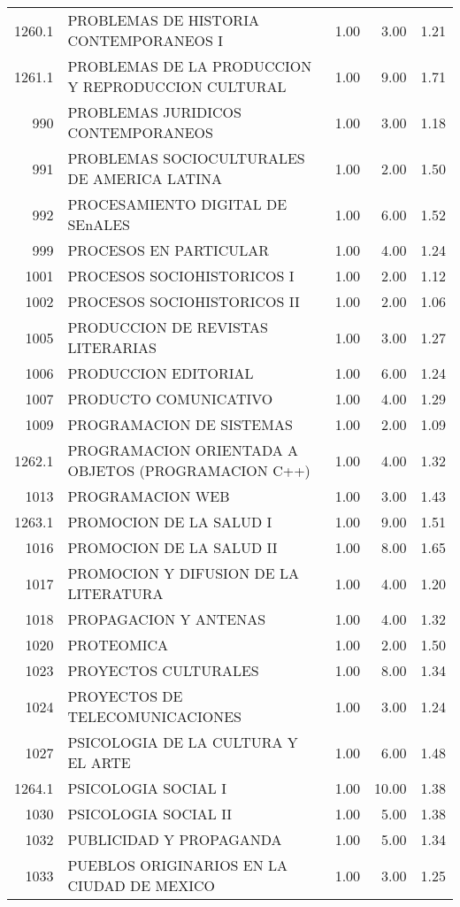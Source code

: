 \begin{table}[ht]
\begin{tabular}{rlrrr}
  1260.1 & PROBLEMAS DE HISTORIA CONTEMPORANEOS I & 1.00 & 3.00 & 1.21 \\ 
  1261.1 & PROBLEMAS DE LA PRODUCCION Y REPRODUCCION CULTURAL & 1.00 & 9.00 & 1.71 \\ 
  990 & PROBLEMAS JURIDICOS CONTEMPORANEOS & 1.00 & 3.00 & 1.18 \\ 
  991 & PROBLEMAS SOCIOCULTURALES DE AMERICA LATINA & 1.00 & 2.00 & 1.50 \\ 
  992 & PROCESAMIENTO DIGITAL DE SEnALES & 1.00 & 6.00 & 1.52 \\ 
  999 & PROCESOS EN PARTICULAR & 1.00 & 4.00 & 1.24 \\ 
  1001 & PROCESOS SOCIOHISTORICOS I & 1.00 & 2.00 & 1.12 \\ 
  1002 & PROCESOS SOCIOHISTORICOS II & 1.00 & 2.00 & 1.06 \\ 
  1005 & PRODUCCION DE REVISTAS LITERARIAS & 1.00 & 3.00 & 1.27 \\ 
  1006 & PRODUCCION EDITORIAL & 1.00 & 6.00 & 1.24 \\ 
  1007 & PRODUCTO COMUNICATIVO & 1.00 & 4.00 & 1.29 \\ 
  1009 & PROGRAMACION DE SISTEMAS & 1.00 & 2.00 & 1.09 \\ 
  1262.1 & PROGRAMACION ORIENTADA A OBJETOS (PROGRAMACION C++) & 1.00 & 4.00 & 1.32 \\ 
  1013 & PROGRAMACION WEB & 1.00 & 3.00 & 1.43 \\ 
  1263.1 & PROMOCION DE LA SALUD I & 1.00 & 9.00 & 1.51 \\ 
  1016 & PROMOCION DE LA SALUD II & 1.00 & 8.00 & 1.65 \\ 
  1017 & PROMOCION Y DIFUSION DE LA LITERATURA & 1.00 & 4.00 & 1.20 \\ 
  1018 & PROPAGACION Y ANTENAS & 1.00 & 4.00 & 1.32 \\ 
  1020 & PROTEOMICA & 1.00 & 2.00 & 1.50 \\ 
  1023 & PROYECTOS CULTURALES & 1.00 & 8.00 & 1.34 \\ 
  1024 & PROYECTOS DE TELECOMUNICACIONES & 1.00 & 3.00 & 1.24 \\ 
  1027 & PSICOLOGIA DE LA CULTURA Y EL ARTE & 1.00 & 6.00 & 1.48 \\ 
  1264.1 & PSICOLOGIA SOCIAL I & 1.00 & 10.00 & 1.38 \\ 
  1030 & PSICOLOGIA SOCIAL II & 1.00 & 5.00 & 1.38 \\ 
  1032 & PUBLICIDAD Y PROPAGANDA & 1.00 & 5.00 & 1.34 \\ 
  1033 & PUEBLOS ORIGINARIOS EN LA CIUDAD DE MEXICO & 1.00 & 3.00 & 1.25 \\ 

\end{tabular}
\end{table}
